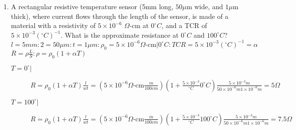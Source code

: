\documentclass{article}
\begin{document}
\begin{enumerate}
\begin{figure}[h]
\end{figure}
\item A rectangular resistive temperature sensor (5mm long, $50\mu$m wide, and $1\mu$m thick), where current flows through the length of the sensor, is made of a material with a resistivity of 
$5 \times 10^{-6}$  $\Omega$-cm at $0^{\circ}C$, and a TCR of $5\times10^{-3} (^{\circ}C)^{-1}$. What is the approximate resistance at $0^{\circ}C$ and $100^{\circ}C$?\\
$l = 5mm\colon 2=50\mu m\colon t = 1\mu m\colon \rho_0 = 5\times10^{-6}\Omega\text{-cm} |  0^{\circ}C\colon TCR = 5\times10^{-3} (^{\circ}C)^{-1} = \alpha$\\
$R = \rho \frac{L}{S} \colon \rho = \rho_0 (1 + \alpha T )$\\
\begin{description}
\item[$T = 0^{\circ} |$] $R  = \rho_0 ( 1 + \alpha T)\frac{l}{w t} = (5\times10^{-6}\Omega\text{-cm}\frac{m}{100cm})(1 + \frac{5\times10^{-3}}{^{\circ}C} 0^{\circ}C)\frac{5\times10^{-3}m}{50\times10^{-6}m 1\times10^{-6}m} = 5\Omega$
\item[$T = 100^{\circ} |$] $R  = \rho_0 ( 1 + \alpha T)\frac{l}{w t} = (5\times10^{-6}\Omega\text{-cm}\frac{m}{100cm})(1 + \frac{5\times10^{-3}}{^{\circ}C} 100^{\circ}C)\frac{5\times10^{-3}m}{50\times10^{-6}m 1\times10^{-6}m} = 7.5\Omega$
	\end{description}


\end{enumerate}
\end{document}
